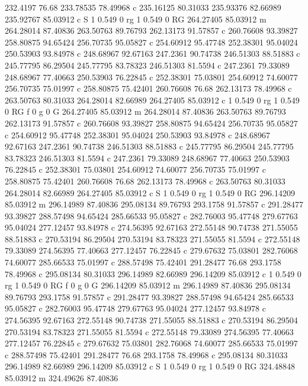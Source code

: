 232.4197 76.68 
233.78535 78.49968 c 
235.16125 80.31033 
235.93376 82.66989 
235.92767 85.03912 c 
S 
1 0.549 0 rg 1 0.549 0 RG 
264.27405 85.03912 m 
264.28014 87.40836 
263.50763 89.76793 
262.13173 91.57857 c 
260.76608 93.39827 
258.80875 94.65424 
256.70735 95.05827 c 
254.60912 95.47748 
252.38301 95.04024 
250.53903 93.84978 c 
248.68967 92.67163 
247.2361 90.74738 
246.51303 88.51883 c 
245.77795 86.29504 
245.77795 83.78323 
246.51303 81.5594 c 
247.2361 79.33089 
248.68967 77.40663 
250.53903 76.22845 c 
252.38301 75.03801 
254.60912 74.60077 
256.70735 75.01997 c 
258.80875 75.42401 
260.76608 76.68 
262.13173 78.49968 c 
263.50763 80.31033 
264.28014 82.66989 
264.27405 85.03912 c 
1 0.549 0 rg 1 0.549 0 RG f 
0 g 0 G 
264.27405 85.03912 m 
264.28014 87.40836 
263.50763 89.76793 
262.13173 91.57857 c 
260.76608 93.39827 
258.80875 94.65424 
256.70735 95.05827 c 
254.60912 95.47748 
252.38301 95.04024 
250.53903 93.84978 c 
248.68967 92.67163 
247.2361 90.74738 
246.51303 88.51883 c 
245.77795 86.29504 
245.77795 83.78323 
246.51303 81.5594 c 
247.2361 79.33089 
248.68967 77.40663 
250.53903 76.22845 c 
252.38301 75.03801 
254.60912 74.60077 
256.70735 75.01997 c 
258.80875 75.42401 
260.76608 76.68 
262.13173 78.49968 c 
263.50763 80.31033 
264.28014 82.66989 
264.27405 85.03912 c 
S 
1 0.549 0 rg 1 0.549 0 RG 
296.14209 85.03912 m 
296.14989 87.40836 
295.08134 89.76793 
293.1758 91.57857 c 
291.28477 93.39827 
288.57498 94.65424 
285.66533 95.05827 c 
282.76003 95.47748 
279.67763 95.04024 
277.12457 93.84978 c 
274.56395 92.67163 
272.55148 90.74738 
271.55055 88.51883 c 
270.53194 86.29504 
270.53194 83.78323 
271.55055 81.5594 c 
272.55148 79.33089 
274.56395 77.40663 
277.12457 76.22845 c 
279.67632 75.03801 
282.76068 74.60077 
285.66533 75.01997 c 
288.57498 75.42401 
291.28477 76.68 
293.1758 78.49968 c 
295.08134 80.31033 
296.14989 82.66989 
296.14209 85.03912 c 
1 0.549 0 rg 1 0.549 0 RG f 
0 g 0 G 
296.14209 85.03912 m 
296.14989 87.40836 
295.08134 89.76793 
293.1758 91.57857 c 
291.28477 93.39827 
288.57498 94.65424 
285.66533 95.05827 c 
282.76003 95.47748 
279.67763 95.04024 
277.12457 93.84978 c 
274.56395 92.67163 
272.55148 90.74738 
271.55055 88.51883 c 
270.53194 86.29504 
270.53194 83.78323 
271.55055 81.5594 c 
272.55148 79.33089 
274.56395 77.40663 
277.12457 76.22845 c 
279.67632 75.03801 
282.76068 74.60077 
285.66533 75.01997 c 
288.57498 75.42401 
291.28477 76.68 
293.1758 78.49968 c 
295.08134 80.31033 
296.14989 82.66989 
296.14209 85.03912 c 
S 
1 0.549 0 rg 1 0.549 0 RG 
324.48848 85.03912 m 
324.49626 87.40836 
